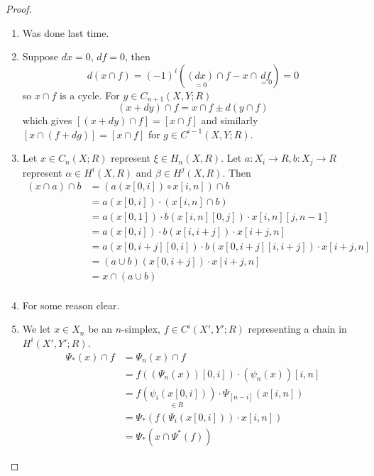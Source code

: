 \documentclass[language=english]{TemplateLecture}
\begin{document}
\begin{proof}
    \begin{enumerate}
        \item Was done last time.
        \item Suppose \(dx = 0\), \(df = 0\), then
        \[d(x \cap f) = (-1)^{i}(\underset{= 0}{(dx)} \cap f - x \cap \underset{= 0}{df}) = 0\]
        so \(x \cap f\) is a cycle. For \(y \in C_{n+1}(X,Y;R)\)
        \[(x+dy) \cap f = x \cap f \pm d(y\cap f)\]
        which gives \([(x+dy) \cap f] = [x \cap f]\) and similarly \([x \cap (f+ dg)] = [x\cap f]\) for \(g \in C^{i-1}(X,Y; R)\).
        \item Let \(x \in C_n(X;R)\) represent \(\xi \in H_n(X,R)\). Let \(a\colon X_i \to R, b\colon X_j \to R\) represent \(\alpha\in H^{i}(X,R)\) and \(\beta \in H^j(X,R)\). Then
        \[\begin{split}
            (x\cap a) \cap b &= (a(x[0,i]) \circ x[i, n]) \cap b\\
            &= a(x[0,i])\cdot (x[i,n] \cap b) \\
            &= a(x[0,1]) \cdot b(x[i,n][0,j]) \cdot x[i,n][j,n-1] \\
            &= a(x[0,i]) \cdot b(x[i, i+j]) \cdot x[i+j, n] \\
            &= a(x[0, i+j][0,i]) \cdot b(x[0, i+j][i, i+j]) \cdot x[i+j,n] \\
            &= (a\cup b)(x[0, i+j]) \cdot x[i+j,n] \\
            &= x \cap (a\cup b) \\
        \end{split}\]
        \item For some reason clear.

        \item We let \(x \in X_n\) be an \(n\)-simplex, \(f \in C^{i}(X', Y'; R)\) representing a chain in \(H^{i}(X', Y'; R)\).
        \[\begin{split}
            \Psi_*(x) \cap f &= \Psi_n(x) \cap f \\
            &= f((\Psi_n(x))[0, i]) \cdot (\psi_n(x))[i,n] \\
            &= \underset{\in R}{f(\psi_i(x[0,i]))} \cdot \Psi_[n-i](x[i,n]) \\
            &= \Psi_*(f(\Psi_i(x[0,i])) \cdot x[i,n]) \\
            &= \Psi_*(x \cap \Psi^*(f))
        \end{split}\]
    \end{enumerate}
\end{proof}
\end{document}
